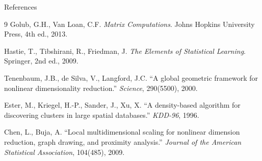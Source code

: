 \documentclass[aspectratio=169,t]{beamer}
\begin{document}



\begin{frame}{References}
  \small
  \begin{thebibliography}{9}
      Golub, G.H., Van Loan, C.F.
      \textit{Matrix Computations}.
      Johns Hopkins University Press, 4th ed., 2013.

      Hastie, T., Tibshirani, R., Friedman, J.
      \textit{The Elements of Statistical Learning}.
      Springer, 2nd ed., 2009.

      Tenenbaum, J.B., de Silva, V., Langford, J.C.
      ``A global geometric framework for nonlinear dimensionality reduction.''
      \textit{Science}, 290(5500), 2000.

      Ester, M., Kriegel, H.-P., Sander, J., Xu, X.
      ``A density-based algorithm for discovering clusters in large spatial databases.''
      \textit{KDD-96}, 1996.

      Chen, L., Buja, A.
      ``Local multidimensional scaling for nonlinear dimension reduction,
        graph drawing, and proximity analysis.''
      \textit{Journal of the American Statistical Association},
      104(485), 2009.
  \end{thebibliography}
\end{frame}
\end{document}
